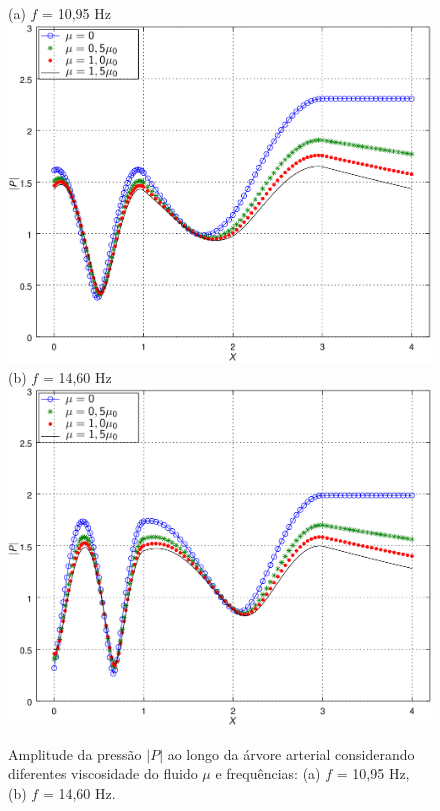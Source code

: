 \documentclass[a4paper,12pt]{monografia}
\theoremstyle{plain}
\theoremstyle{definition}
\theoremstyle{remark}
\begin{document}
\begin{figure}[!htbp]
	\centering
	(a) $f$ = 10,95 Hz\\
	\includegraphics[scale=0.7]{figure3-result-new/fig3_P_f10_95_visc_new2.png}\\
	(b) $f$ = 14,60 Hz\\
	\includegraphics[scale=0.7]{figure3-result-new/fig3_P_f14_60_visc_new2.png}\\
	\caption{Amplitude da pressão $|P|$ ao longo da árvore arterial considerando diferentes viscosidade do fluido $\mu$ e frequências: (a) $f$ = 10,95 Hz, (b)  $f$ = 14,60 Hz. }
	\label{fig3b:arterial-tree}%
\end{figure}
\end{document}
